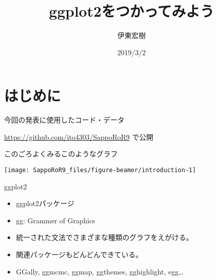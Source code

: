 \documentclass[ignorenonframetext,]{beamer}
\title{ggplot2をつかってみよう}
\author{伊東宏樹}
\date{2019/3/2}
\providecommand{\tightlist}{%
  \setlength{\itemsep}{0pt}\setlength{\parskip}{0pt}}
\begin{document}
\frame{\titlepage}

\section{はじめに}

\begin{frame}{今回の発表に使用したコード・データ}

\url{https://github.com/ito4303/SappoRoR9} で公開

\end{frame}

\begin{frame}{このごろよくみるこのようなグラフ}

\texttt{[image: SappoRoR9\_files/figure-beamer/introduction-1]}

\end{frame}

\begin{frame}{ggplot2}

\LARGE

\begin{itemize}[<+->]
\tightlist
\item
  ggplot2パッケージ
\end{itemize}

\normalsize

\begin{itemize}[<+->]
\tightlist
\item
  gg: Grammer of Graphics
\end{itemize}

\large

\begin{itemize}[<+->]
\tightlist
\item
  統一された文法でさまざまな種類のグラフをえがける。
\item
  関連パッケージもどんどんできている。
\item
  GGally, ggmcmc, ggmap, ggthemes, gghighlight, egg\dots
\end{itemize}

\end{frame}
\end{document}
